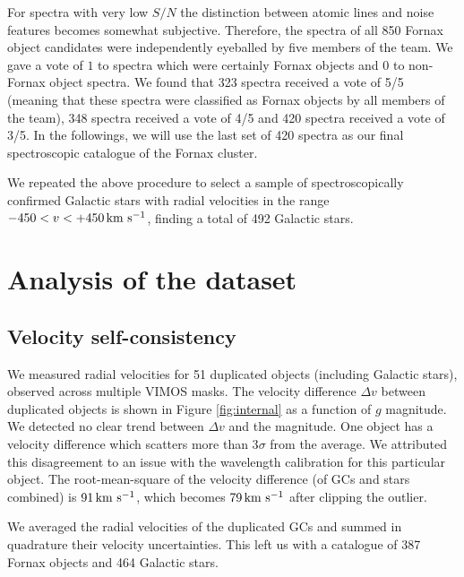 \documentclass[useAMS,usenatbib]{mn2e}
\newcommand{\kms}{\mbox{\,km~s$^{-1}$}}
\begin{document}
For spectra with very low $S/N$ the distinction between atomic lines and noise features becomes somewhat subjective. Therefore, the spectra of all 850 Fornax object candidates were independently eyeballed by five members of the team. We gave a vote of $1$ to spectra which were certainly Fornax objects and $0$ to non-Fornax object spectra. We found that 323 spectra received a vote of 5/5 (meaning that these spectra were classified as Fornax objects by all members of the team), 348 spectra received a vote of 4/5 and 420 spectra received a vote of 3/5. In the followings, we will use the last set of 420 spectra as our final spectroscopic catalogue of the Fornax cluster. 

We repeated the above procedure to select a sample of spectroscopically confirmed Galactic stars with radial velocities in the range $-450<v<+450 \kms$, finding a total of 492 Galactic stars.

\section{Analysis of the dataset}
\label{sec:analysis}
\subsection{Velocity self-consistency}

We measured radial velocities for 51 duplicated objects (including Galactic stars), observed across multiple VIMOS masks. The velocity difference $\Delta v$ between duplicated objects is shown in Figure \ref{fig:internal} as a function of $g$ magnitude. We detected no clear trend between $\Delta v$ and the magnitude. One object has a velocity difference which scatters more than 3$\sigma$ from the average. We attributed this disagreement to an issue with the wavelength calibration for this particular object. The root-mean-square of the velocity difference (of GCs and stars combined) is $91 \kms$, which becomes $79\kms$ after clipping the outlier. 

We averaged the radial velocities of the duplicated GCs and summed in quadrature their velocity uncertainties. This left us with a catalogue of 387 Fornax objects and 464 Galactic stars.
\end{document}
